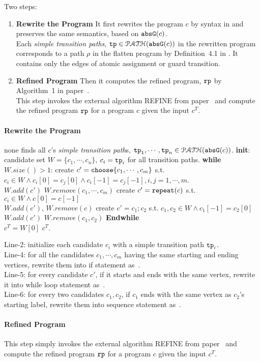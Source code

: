 Two steps:
\begin{enumerate}
    \item \textbf{Rewrite the Program}
    It first rewrites the program $c$ by syntax in \cite{GulwaniJK09} and preserves the same semantics, based on $\mathtt{abs}{\mathtt{G}}(c)$.
\\
Each \emph{simple transition paths}, $\mathtt{tp} \in \mathcal{PATH}(\mathtt{abs}{\mathtt{G}}(c))$ in the rewritten program
corresponds to a path $\rho$ in the flatten program by Definition~4.1 in \cite{GulwaniJK09}.
%
It contains only the edges of atomic assignment or guard transition.
\item \textbf{Refined Program}
Then it computes the 
refined program, $\mathtt{rp}$ by Algorithm~1 in paper~\cite{GulwaniJK09}.
\\
This step invokes the external algorithm REFINE from paper~\cite{GulwaniJK09} and compute the 
refined program $\mathtt{rp}$ for a program $c$ given the input $c^{T}$.
\end{enumerate}

\paragraph{Rewrite the Program}
\begin{algorithmic}[1]
    \REQUIRE none
    \STATE finds all $c$'s \emph{simple transition path}s, $\mathtt{tp}_1, \cdots, \mathtt{tp}_n \in \mathcal{PATH}(\mathtt{abs}{\mathtt{G}}(c))$.
    \STATE \textbf{init}: candidate set $W = \{c_1, \cdots, c_n\}$, $c_i = \mathtt{tp}_i$ for all transition paths.
    \STATE \textbf{while} $W.size()> 1$:
    \STATE \quad create $c' = \rpchoose{c_1, \cdots, c_m}$ 
    s.t. $c_i \in W \land c_i[0] = c_j[0] \land c_i[-1] = c_j[-1], i, j = 1, \cdots, m$.
    \\ \quad $W.add(c')$ \qquad $W.remove(c_1, \cdots, c_m)$
    \STATE
    \quad create $c' = \mathtt{repeat}(c)$ s.t. $c_i \in W \land c[0] = c[-1]$
    \\ \quad $W.add(c')$, \qquad $W.remove(c)$
    \STATE \quad create $c' = c_1; c_2$ s.t. $c_1, c_2 \in W \land c_1[-1] = c_2[0]$
    \\
    \quad $W.add(c')$ \qquad $W.remove(c_1, c_2)$
    \STATE \textbf{Endwhile}
    \\ $c^T = W[0]$
    \RETURN $c^T$.
\end{algorithmic}
%
Line-2: initialize each candidate $c_i$ with a simple transition path $\mathtt{tp}_i$.
\\
Line-4: for all the candidates $c_1, \cdots, c_m$ having the same starting and ending vertices, rewrite them into if statement as~\cite{GulwaniJK09}.
\\
Line-5: for every candidate $c'$, if it starts and ends with the same vertex, rewrite it into while loop statement as~\cite{GulwaniJK09}.
\\
Line-6: for every two candidates $c_1, c_2$, if $c_1$ ends with the same vertex as $c_2$'s starting label, rewrite them into sequence statement as~\cite{GulwaniJK09}.

\paragraph{Refined Program}
This step simply invokes the external algorithm REFINE from paper~\cite{GulwaniJK09} and compute the 
refined program $\mathtt{rp}$ for a program $c$ given the input $c^{T}$.
